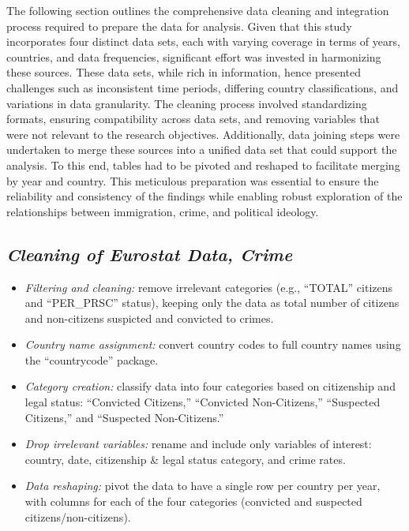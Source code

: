\documentclass[
]{article}
\begin{document}
The following section outlines the comprehensive data cleaning and
integration process required to prepare the data for analysis. Given
that this study incorporates four distinct data sets, each with varying
coverage in terms of years, countries, and data frequencies, significant
effort was invested in harmonizing these sources. These data sets, while
rich in information, hence presented challenges such as inconsistent
time periods, differing country classifications, and variations in data
granularity. The cleaning process involved standardizing formats,
ensuring compatibility across data sets, and removing variables that
were not relevant to the research objectives. Additionally, data joining
steps were undertaken to merge these sources into a unified data set
that could support the analysis. To this end, tables had to be pivoted
and reshaped to facilitate merging by year and country. This meticulous
preparation was essential to ensure the reliability and consistency of
the findings while enabling robust exploration of the relationships
between immigration, crime, and political ideology.

\subsection{\texorpdfstring{\emph{Cleaning of Eurostat Data,
Crime}}{Cleaning of Eurostat Data, Crime}}\label{cleaning-of-eurostat-data-crime}

\begin{itemize}
\item
  \emph{Filtering and cleaning:} remove irrelevant categories (e.g.,
  ``TOTAL'' citizens and ``PER\_PRSC'' status), keeping only the data as
  total number of citizens and non-citizens suspicted and convicted to
  crimes.
\item
  \emph{Country name assignment:} convert country codes to full country
  names using the ``countrycode'' package.
\item
  \emph{Category creation:} classify data into four categories based on
  citizenship and legal status: ``Convicted Citizens,'' ``Convicted
  Non-Citizens,'' ``Suspected Citizens,'' and ``Suspected
  Non-Citizens.''
\item
  \emph{Drop irrelevant variables:} rename and include only variables of
  interest: country, date, citizenship \& legal status category, and
  crime rates.
\item
  \emph{Data reshaping:} pivot the data to have a single row per country
  per year, with columns for each of the four categories (convicted and
  suspected citizens/non-citizens).
\end{itemize}
\end{document}
